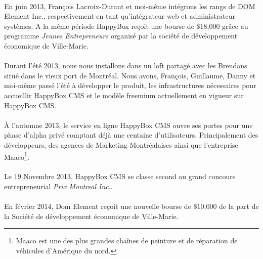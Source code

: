 \documentclass[11pt, a4paper ]{article}
\begin{document}
\begin{spacing}{1.5}

\paragraph{}
En juin 2013, François Lacroix-Durant et moi-même intégrons les rangs de DOM Element Inc., respectivement en tant qu'intégrateur web et administrateur systèmes. A la même période HappyBox reçoit une bourse de  \$18,000 grâce au programme \emph{Jeunes Entrepreneurs} organisé par la société de développement économique de Ville-Marie.

\paragraph{} %
Durant l'été 2013, nous nous installons dans un loft partagé avec les Brendans situé dans le vieux port de Montréal. Nous avons, François, Guillaume, Danny et moi-même passé l'été à développer le produit, les infrastructures nécessaires pour accueillir HappyBox CMS et le modèle freemium actuellement en vigueur sur HappyBox CMS.


\paragraph{}
À l'automne 2013, le service en ligne HappyBox CMS ouvre ses portes pour une phase d'alpha privé comptant déjà une centaine d'utilisateurs. Principalement des développeurs, des agences de Marketing Montréalaises ainsi que l'entreprise Maaco\footnote{Maaco est une des plus grandes chaînes de peinture et de réparation de véhicules d'Amérique du nord.}.

\paragraph{}
Le 19 Novembre 2013, HappyBox CMS se classe second au grand concours entrepreneurial \emph{Prix Montreal Inc}..

\paragraph{}
En février 2014, Dom Element reçoit une nouvelle bourse de \$10,000 de la part de la Société de développement économique de Ville-Marie.


\end{spacing}
\end{document}
